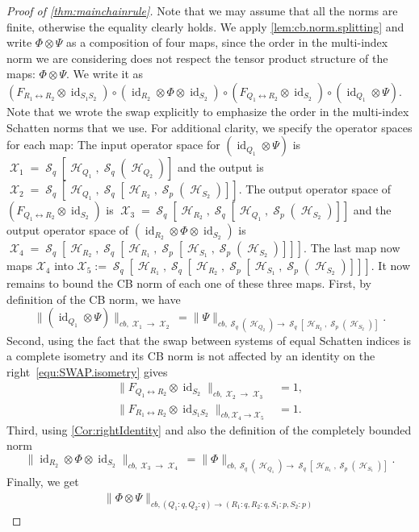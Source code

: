 \documentclass[11pt]{article}
\DeclareMathOperator{\id}{id}
\newcommand{\1}{\ensuremath{\mathbbm{1}}}
\theoremstyle{newdefinition}
\theoremstyle{newplain}
\theoremstyle{myplain}
\DeclareMathOperator{\cH}{\mathcal{H}}
\DeclareMathOperator{\cS}{\mathcal{S}}
\DeclareMathOperator{\cX}{\mathcal{X}}
\begin{document}
\begin{proof}[Proof of \cref{thm:mainchainrule}]
Note that we may assume that all the norms are finite, otherwise the equality clearly holds.
We apply \cref{lem:cb.norm.splitting} and write $\Phi \otimes \Psi$ as a composition of four maps, since the order in the multi-index norm we are considering does not respect the tensor product structure of the maps: $\Phi \otimes \Psi.$ We write it as $(F_{R_1\leftrightarrow R_2}\otimes\id_{S_1S_2})\circ(\id_{R_2} \otimes \Phi \otimes \id_{S_2}) \circ (F_{Q_1 \leftrightarrow R_2} \otimes \id_{S_2}) \circ (\id_{Q_1} \otimes \Psi)$. Note that we wrote the swap explicitly to emphasize the order in the multi-index Schatten norms that we use. For additional clarity, we specify the operator spaces for each map: The input operator space for $(\id_{Q_1} \otimes \Psi)$ is $\cX_1 = \cS_q[\cH_{Q_1},\cS_q(\cH_{Q_2})]$ and the output is $\cX_2 = \cS_q[\cH_{Q_1}, \cS_{q}[\cH_{R_2}, \cS_{p}(\cH_{S_2})]]$. The output operator space of $(F_{Q_1 \leftrightarrow R_2} \otimes \id_{S_2})$ is $\cX_3 = \cS_q[\cH_{R_2}, \cS_{q}[\cH_{Q_1}, \cS_{p}(\cH_{S_2})]]$ and the output operator space of $(\id_{R_2} \otimes \Phi \otimes \id_{S_2})$ is $\cX_4 = \cS_q[\cH_{R_2}, \cS_{q}[\cH_{R_1}, \cS_{p}[\cH_{S_1}, \cS_{p}(\cH_{S_2})]]]$. The last map now maps $\mathcal{X}_4$ into $\mathcal{X}_5:=\cS_q[\cH_{R_1}, \cS_{q}[\cH_{R_2}, \cS_{p}[\cH_{S_1}, \cS_{p}(\cH_{S_2})]]]$. It now remains to bound the CB norm of each one of these three maps. First, by definition of the CB norm, we have
\[
\| (\id_{Q_1} \otimes \Psi) \|_{cb,\cX_1 \to \cX_2} = \| \Psi \|_{cb, \cS_q(\cH_{Q_2}) \to \cS_{q}[\cH_{R_2}, \cS_{p}(\cH_{S_2})]}.
\]
Second, using the fact that the swap between systems of equal Schatten indices is a complete isometry and its CB norm is not affected by an identity on the right~\eqref{equ:SWAP.isometry} gives
\begin{align}
 \|F_{Q_1 \leftrightarrow R_2} \otimes \id_{S_2} \|_{cb, \cX_2 \to \cX_3} &= 1, \\
 \|F_{R_1\leftrightarrow R_2}\otimes\id_{S_1S_2}\|_{cb,\mathcal{X}_4\to\mathcal{X}_5} &= 1.
\end{align}
Third, using \cref{Cor:rightIdentity} and also the definition of the completely bounded norm
\[
\| \id_{R_2} \otimes \Phi \otimes \id_{S_2} \|_{cb,\cX_3 \to \cX_4} = \| \Phi \|_{cb,\cS_q(\cH_{Q_1}) \to \cS_{q}[\cH_{R_1},\cS_p(\cH_{S_1})]}.
\]
Finally, we get
\begin{align}
\|\Phi\otimes\Psi\|_{cb,(Q_1:q,Q_2:q)\to(R_1:q,R_2:q,S_1:p,S_2:p)} %

\end{align}
\end{proof}
\end{document}
